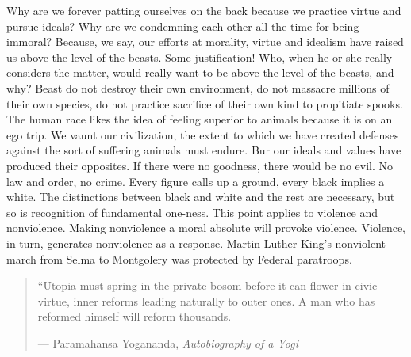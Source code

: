 \documentclass[12pt, onecolumn, letterpaper, oneside]{book}
\begin{document}
Why are we forever patting ourselves on the back because we practice virtue and pursue ideals? Why are we condemning each other all the time for being immoral? Because, we say, our efforts at morality, virtue and idealism have raised us above the level of the beasts. Some justification! Who, when he or she really considers the matter, would really want to be above the level of the beasts, and why? Beast do not destroy their own environment, do not massacre millions of their own species, do not practice sacrifice of their own kind to propitiate spooks. The human race likes the idea of feeling superior to animals because it is on an ego trip. We vaunt our civilization, the extent to which we have created defenses against the sort of suffering animals must endure. Bur our ideals and values have produced their opposites. If there were no goodness, there would be no evil. No law and order, no crime. Every figure calls up a ground, every black implies a white. The distinctions between black and white and the rest are necessary, but so is recognition of fundamental one-ness. This point applies to violence and nonviolence. Making nonviolence a moral absolute will provoke violence. Violence, in turn, generates nonviolence as a response. Martin Luther King's nonviolent march from Selma to Montgolery was protected by Federal paratroops.

\newpage
\blockquote{``Utopia must spring in the private bosom before it can flower in civic virtue, inner reforms leading naturally to outer ones. A man who has reformed himself will reform thousands.
\par\begin{flushright} --- Paramahansa Yogananda, \emph{Autobiography of a Yogi}\end{flushright}
}
\end{document}
